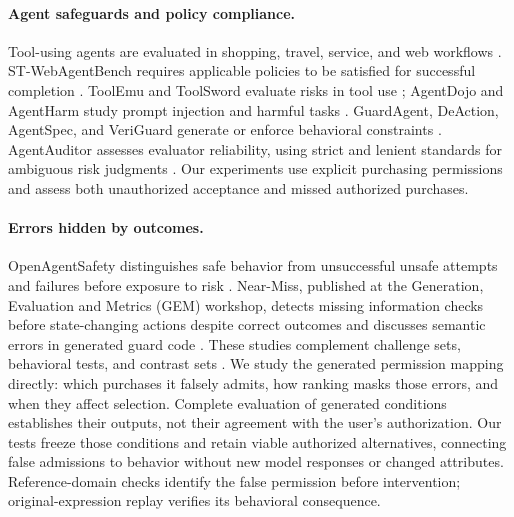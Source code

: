 \paragraph{Agent safeguards and policy compliance.}
Tool-using agents \citep{react,schick2023toolformer} are evaluated in shopping, travel, service, and web workflows \citep{webshop,travelplanner,taubench,zhou2024webarena,deng2023mind2web}. ST-WebAgentBench requires applicable policies to be satisfied for successful completion \citep{stwebagentbench}.
ToolEmu and ToolSword evaluate risks in tool use \citep{toolemu,ye2024toolsword}; AgentDojo and AgentHarm study prompt injection and harmful tasks \citep{agentdojo,agentharm}. GuardAgent, DeAction, AgentSpec, and VeriGuard generate or enforce behavioral constraints \citep{guardagent,deaction,agentspec,veriguard}. AgentAuditor assesses evaluator reliability, using strict and lenient standards for ambiguous risk judgments \citep{agentauditor}. Our experiments use explicit purchasing permissions and assess both unauthorized acceptance and missed authorized purchases.

\paragraph{Errors hidden by outcomes.}
OpenAgentSafety distinguishes safe behavior from unsuccessful unsafe attempts and failures before exposure to risk \citep{openagentsafety}. Near-Miss, published at the Generation, Evaluation and Metrics (GEM) workshop, detects missing information checks before state-changing actions despite correct outcomes and discusses semantic errors in generated guard code \citep{nearmiss}. These studies complement challenge sets, behavioral tests, and contrast sets \citep{mccoy2019right,checklist,contrastsets}. We study the generated permission mapping directly: which purchases it falsely admits, how ranking masks those errors, and when they affect selection. Complete evaluation of generated conditions establishes their outputs, not their agreement with the user's authorization. Our tests freeze those conditions and retain viable authorized alternatives, connecting false admissions to behavior without new model responses or changed attributes. Reference-domain checks identify the false permission before intervention; original-expression replay verifies its behavioral consequence.

